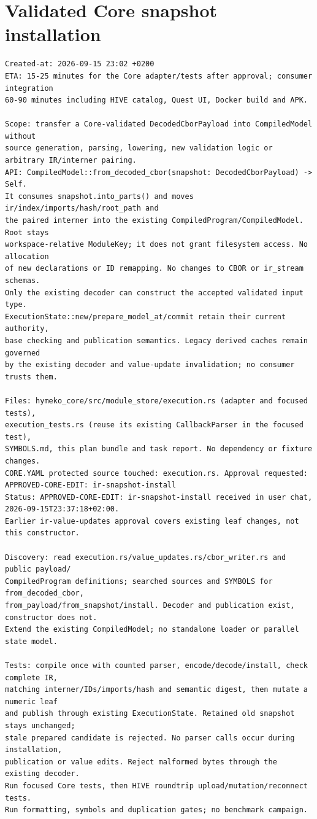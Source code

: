 \documentclass{article}
\begin{document}
\section*{Validated Core snapshot installation}
\begin{verbatim}
Created-at: 2026-09-15 23:02 +0200
ETA: 15-25 minutes for the Core adapter/tests after approval; consumer integration
60-90 minutes including HIVE catalog, Quest UI, Docker build and APK.

Scope: transfer a Core-validated DecodedCborPayload into CompiledModel without
source generation, parsing, lowering, new validation logic or arbitrary IR/interner pairing.
API: CompiledModel::from_decoded_cbor(snapshot: DecodedCborPayload) -> Self.
It consumes snapshot.into_parts() and moves ir/index/imports/hash/root_path and
the paired interner into the existing CompiledProgram/CompiledModel. Root stays
workspace-relative ModuleKey; it does not grant filesystem access. No allocation
of new declarations or ID remapping. No changes to CBOR or ir_stream schemas.
Only the existing decoder can construct the accepted validated input type.
ExecutionState::new/prepare_model_at/commit retain their current authority,
base checking and publication semantics. Legacy derived caches remain governed
by the existing decoder and value-update invalidation; no consumer trusts them.

Files: hymeko_core/src/module_store/execution.rs (adapter and focused tests),
execution_tests.rs (reuse its existing CallbackParser in the focused test),
SYMBOLS.md, this plan bundle and task report. No dependency or fixture changes.
CORE.YAML protected source touched: execution.rs. Approval requested:
APPROVED-CORE-EDIT: ir-snapshot-install
Status: APPROVED-CORE-EDIT: ir-snapshot-install received in user chat, 2026-09-15T23:37:18+02:00.
Earlier ir-value-updates approval covers existing leaf changes, not this constructor.

Discovery: read execution.rs/value_updates.rs/cbor_writer.rs and public payload/
CompiledProgram definitions; searched sources and SYMBOLS for from_decoded_cbor,
from_payload/from_snapshot/install. Decoder and publication exist, constructor does not.
Extend the existing CompiledModel; no standalone loader or parallel state model.

Tests: compile once with counted parser, encode/decode/install, check complete IR,
matching interner/IDs/imports/hash and semantic digest, then mutate a numeric leaf
and publish through existing ExecutionState. Retained old snapshot stays unchanged;
stale prepared candidate is rejected. No parser calls occur during installation,
publication or value edits. Reject malformed bytes through the existing decoder.
Run focused Core tests, then HIVE roundtrip upload/mutation/reconnect tests.
Run formatting, symbols and duplication gates; no benchmark campaign.


\end{verbatim}
\end{document}
